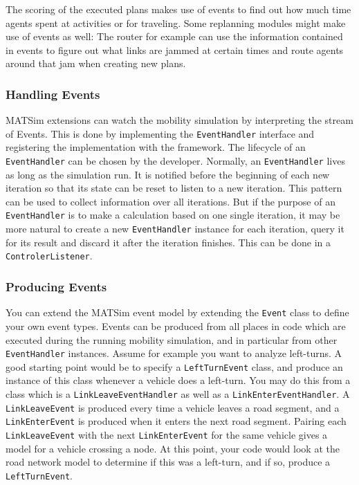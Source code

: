 The scoring of the executed plans makes use of events to find out how much time agents spent at activities or for traveling. Some replanning modules might make use of events as well: The router for example can use the information contained in events to figure out what links are jammed at certain times and route agents around that jam when creating new plans.

\subsubsection{Handling Events}
MATSim extensions can watch the mobility simulation by interpreting the stream of Events. This is done
by implementing the \lstinline$EventHandler$ interface and registering the implementation with the framework. The lifecycle of
an \lstinline$EventHandler$ can be chosen by the developer. Normally, an \lstinline$EventHandler$ lives as long as the simulation run.
It is notified before the beginning of each new iteration so that its state can be reset to listen to a new
iteration. This pattern can be used to collect information over all iterations. But if the purpose of
an \lstinline$EventHandler$ is to make a calculation based on one single iteration, it may be more natural
to create a new \lstinline$EventHandler$ instance for each iteration, query it for its result and discard it
after the iteration finishes. This can be done in a \lstinline$ControlerListener$.


\subsubsection{Producing Events}
You can extend the MATSim event model by extending the \lstinline$Event$ class to define your own event types.
Events can be produced from all places in code which are executed during the running mobility simulation,
and in particular from other \lstinline$EventHandler$ instances. Assume for example you want to analyze
left-turns. A good starting point would be to specify a \lstinline$LeftTurnEvent$ class, and produce
an instance of this class whenever a vehicle does a left-turn. You may do this from a class which is a 
\lstinline$LinkLeaveEventHandler$ as well as a \lstinline$LinkEnterEventHandler$. 
A \lstinline$LinkLeaveEvent$ is produced every time a vehicle leaves a road segment, and a \lstinline$LinkEnterEvent$ is
produced when it enters the next road segment. Pairing each \lstinline$LinkLeaveEvent$ with the next \lstinline$LinkEnterEvent$ for
the same vehicle gives a model for a vehicle crossing a node. At this point, your code would look at the road
network model to determine if this was a left-turn, and if so, produce a \lstinline$LeftTurnEvent$.
    
